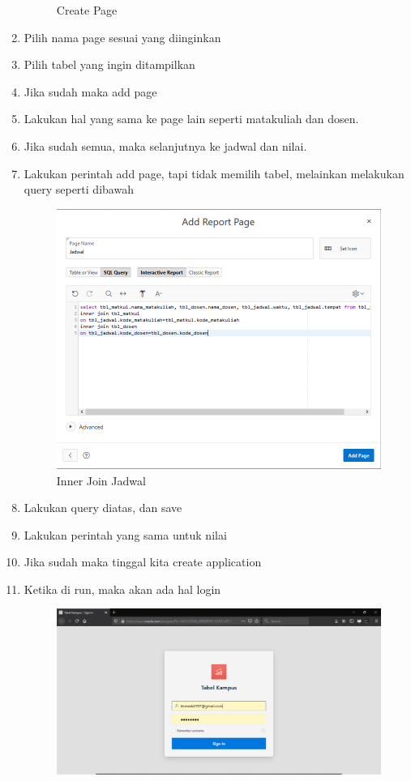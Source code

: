 \documentclass{article}
\begin{document}
\begin{enumerate}
\begin{figure}[!htbp]
        \caption{Create Page}
    \end{figure}
    \item Pilih nama page sesuai yang diinginkan
    \item Pilih tabel yang ingin ditampilkan
    \item Jika sudah maka add page
    \item Lakukan hal yang sama ke page lain seperti matakuliah dan dosen.
\newpage
    \item Jika sudah semua, maka selanjutnya ke jadwal dan nilai.
    \item Lakukan perintah add page, tapi tidak memilih tabel, melainkan melakukan query seperti dibawah
    \begin{figure}[!htbp]
        \centering
        \includegraphics[scale=0.4]{figure/innerjoinjadwal.PNG}
        \caption{Inner Join Jadwal}
    \end{figure}
    \item Lakukan query diatas, dan save
    \item Lakukan perintah yang sama untuk nilai
    \item Jika sudah maka tinggal kita create application
\newpage
    \item Ketika di run, maka akan ada hal login
    \begin{figure}[!htbp]
        \centering
        \includegraphics[scale=0.3]{figure/login.PNG}

\end{figure}
\end{enumerate}
\end{document}
